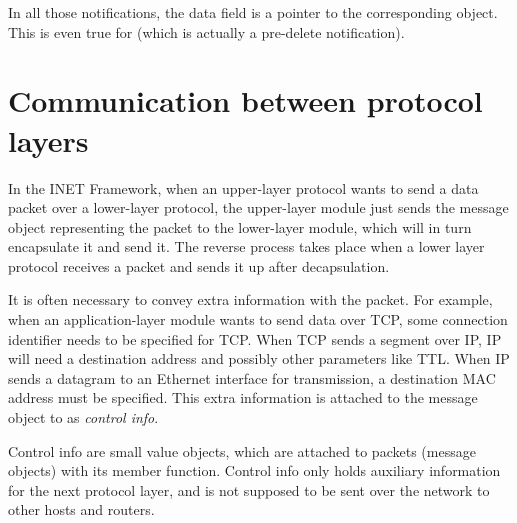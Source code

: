 In all those notifications, the data field is a pointer to the
corresponding  object. This is even true for
 (which is actually a pre-delete notification).
\fi

\iffalse TODO
\section{Initialization Stages}

Node architecture makes it necessary to use multi-stage initialization.
What happens in each stage is this:

In stage 0, interfaces register themselves in \nedtype{InterfaceTable} modules

In stage 1, routing files are read.

In stage 2, network configurators (e.g. \nedtype{FlatNetworkConfiguration})
assign addresses and set up routing tables.

In stage 3, TODO...

In stage 4, TODO...

...

The multi-stage initialization process itself is described in the OMNeT++ Manual.
\fi

\section{Communication between protocol layers}

In the INET Framework, when an upper-layer protocol wants to send a data
packet over a lower-layer protocol, the upper-layer module just sends the
message object representing the packet to the lower-layer module, which
will in turn encapsulate it and send it. The reverse process takes place
when a lower layer protocol receives a packet and sends it up after
decapsulation.

It is often necessary to convey extra information with the packet. For
example, when an application-layer module wants to send data over TCP, some
connection identifier needs to be specified for TCP. When TCP sends a
segment over IP, IP will need a destination address and possibly other
parameters like TTL. When IP sends a datagram to an Ethernet interface for
transmission, a destination MAC address must be specified. This extra
information is attached to the message object to as \textit{control info}.

Control info are small value objects, which are attached to packets
(message objects) with its  member function.
Control info only holds auxiliary information for the next protocol layer,
and is not supposed to be sent over the network to other hosts and routers.


